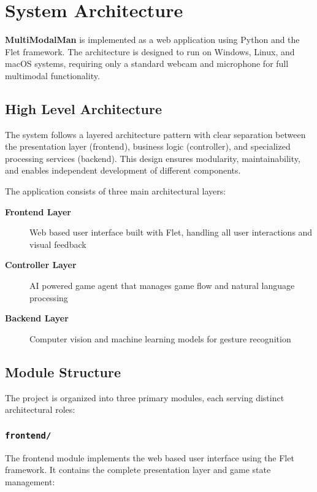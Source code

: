 \section{System Architecture}

\textbf{MultiModalMan} is implemented as a web application using Python and the Flet framework. The architecture is designed to run on Windows, Linux, and macOS systems, requiring only a standard webcam and microphone for full multimodal functionality.

\subsection*{High Level Architecture}
The system follows a layered architecture pattern with clear separation between the presentation layer (frontend), business logic (controller), and specialized processing services (backend). This design ensures modularity, maintainability, and enables independent development of different components.

The application consists of three main architectural layers:

\begin{description}
\item[\textbf{Frontend Layer}] Web based user interface built with Flet, handling all user interactions and visual feedback
\item[\textbf{Controller Layer}] AI powered game agent that manages game flow and natural language processing
\item[\textbf{Backend Layer}] Computer vision and machine learning models for gesture recognition
\end{description}

\subsection*{Module Structure}
The project is organized into three primary modules, each serving distinct architectural roles:

\subsubsection*{\texttt{frontend/}}
The frontend module implements the web based user interface using the Flet framework. It contains the complete presentation layer and game state management:

